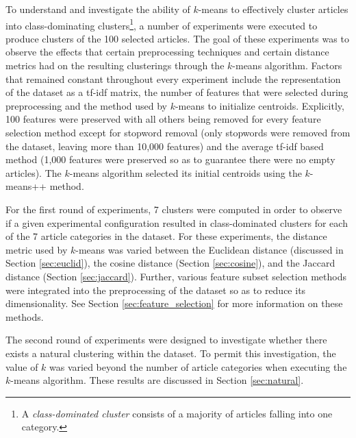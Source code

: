 \documentclass[11pt]{article}
\begin{document}
To understand and investigate the ability of $k$-means to effectively cluster articles into class-dominating clusters\footnote{A \emph{class-dominated cluster} consists of a majority of articles falling into one category.}, a number of experiments were executed to produce clusters of the 100 selected articles.
The goal of these experiments was to observe the effects that certain preprocessing techniques and certain distance metrics had on the resulting clusterings through the $k$-means algorithm.
Factors that remained constant throughout every experiment include the representation of the dataset as a tf-idf matrix, the number of features that were selected during preprocessing and the method used by $k$-means to initialize centroids.
Explicitly, 100 features were preserved with all others being removed for every feature selection method except for stopword removal (only stopwords were removed from the dataset, leaving more than 10,000 features) and the average tf-idf based method (1,000 features were preserved so as to guarantee there were no empty articles).
The $k$-means algorithm selected its initial centroids using the $k$-means++ \cite{Arthur:2007:KAC:1283383.1283494} method.

For the first round of experiments, 7 clusters were computed in order to observe if a given experimental configuration resulted in class-dominated clusters for each of the 7 article categories in the dataset.
For these experiments, the distance metric used by $k$-means was varied between the Euclidean distance (discussed in Section \ref{sec:euclid}), the cosine distance (Section \ref{sec:cosine}), and the Jaccard distance (Section \ref{sec:jaccard}).
Further, various feature subset selection methods were integrated into the preprocessing of the dataset so as to reduce its dimensionality.
See Section \ref{sec:feature_selection} for more information on these methods.

The second round of experiments were designed to investigate whether there exists a natural clustering within the dataset.
To permit this investigation, the value of $k$ was varied beyond the number of article categories when executing the $k$-means algorithm.
These results are discussed in Section \ref{sec:natural}.
\end{document}
